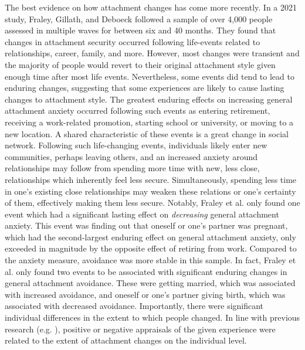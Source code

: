 \documentclass[12pt]{report}
\begin{document}
The best evidence on how attachment changes has come more recently. In a 2021 study, Fraley, Gillath, and Deboeck followed a sample of over 4,000 people assessed in multiple waves for between six and 40 months. They found that changes in attachment security occurred following life-events related to relationships, career, family, and more. However, most changes were transient and the majority of people would revert to their original attachment style given enough time after most life events.
Nevertheless, some events did tend to lead to enduring changes, suggesting that some experiences are likely to cause lasting changes to attachment style.
The greatest enduring effects on increasing general attachment anxiety occurred following such events as entering retirement, receiving a work-related promotion, starting school or university, or moving to a new location. A shared characteristic of these events is a great change in social network. Following such life-changing events, individuals likely enter new communities, perhaps leaving others, and an increased anxiety around relationships may follow from spending more time with new, less close, relationships which inherently feel less secure.
Simultaneously, spending less time in one's existing close relationships may weaken these relations or one's certainty of them, effectively making them less secure.
Notably, Fraley et al. only found one event which had a significant lasting effect on \textit{decreasing} general attachment anxiety. This event was finding out that oneself or one's partner was pregnant, which had the second-largest enduring effect on general attachment anxiety, only exceeded in magnitude by the opposite effect of retiring from work.
Compared to the anxiety measure, avoidance was more stable in this sample. In fact, Fraley et al. only found two events to be associated with significant enduring changes in general attachment avoidance. These were getting married, which was associated with increased avoidance, and oneself or one's partner giving birth, which was associated with decreased avoidance.
Importantly, there were significant individual differences in the extent to which people changed. In line with previous research (e.g. \cite{Zhang2004}), positive or negative appraisals of the given experience were related to the extent of attachment changes on the individual level.
\end{document}
